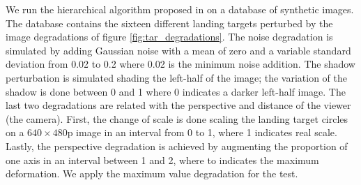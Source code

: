 We run the hierarchical algorithm proposed in \citep{BaquedanoA.:ESIEE:2017} on a database of synthetic images. The database contains the sixteen different landing targets perturbed by the image degradations of figure \ref{fig:tar_degradations}. 
The noise degradation is simulated by adding Gaussian noise with a mean of zero and a variable standard deviation from 0.02 to 0.2 where 0.02 is the minimum noise addition. The shadow perturbation is simulated shading the left-half of the image; the variation of the shadow is done between 0 and 1 where 0 indicates a darker left-half image. The last two degradations are related with the perspective and distance of the viewer (the camera). First, the change of scale is done scaling the landing target circles on a $640\times480$p image in an interval from 0 to 1, where 1 indicates real scale. Lastly, the perspective degradation is achieved by augmenting the proportion of one axis in an interval between 1 and 2, where to indicates the maximum deformation. We apply the maximum value degradation for the test.
 

